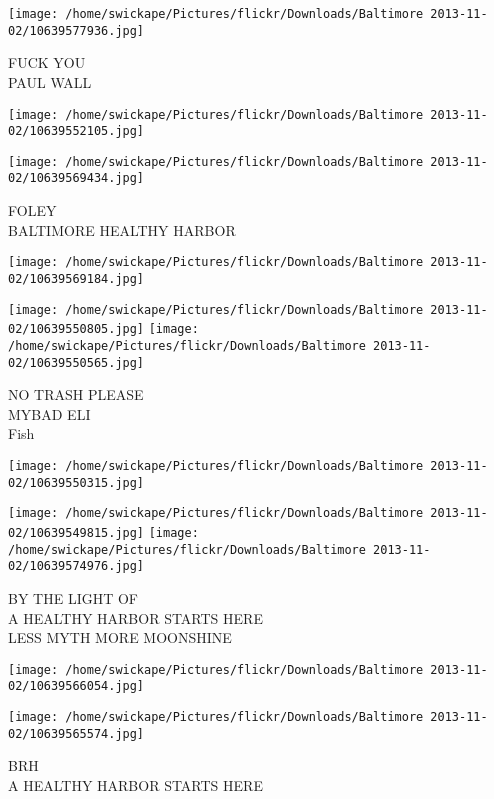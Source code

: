 \documentclass[10pt,letterpaper]{article}
\begin{document}
\vspace{0.25in}
\texttt{[image: /home/swickape/Pictures/flickr/Downloads/Baltimore 2013-11-02/10639577936.jpg]}

FUCK YOU\\
PAUL WALL
\pagebreak

\texttt{[image: /home/swickape/Pictures/flickr/Downloads/Baltimore 2013-11-02/10639552105.jpg]}

\vspace{0.25in}
\texttt{[image: /home/swickape/Pictures/flickr/Downloads/Baltimore 2013-11-02/10639569434.jpg]}

FOLEY\\
BALTIMORE HEALTHY HARBOR
\pagebreak

\texttt{[image: /home/swickape/Pictures/flickr/Downloads/Baltimore 2013-11-02/10639569184.jpg]}

\vspace{0.25in}
\texttt{[image: /home/swickape/Pictures/flickr/Downloads/Baltimore 2013-11-02/10639550805.jpg]}
\texttt{[image: /home/swickape/Pictures/flickr/Downloads/Baltimore 2013-11-02/10639550565.jpg]}

NO TRASH PLEASE\\
MYBAD ELI\\
Fish
\pagebreak

\texttt{[image: /home/swickape/Pictures/flickr/Downloads/Baltimore 2013-11-02/10639550315.jpg]}

\vspace{0.25in}
\texttt{[image: /home/swickape/Pictures/flickr/Downloads/Baltimore 2013-11-02/10639549815.jpg]}
\texttt{[image: /home/swickape/Pictures/flickr/Downloads/Baltimore 2013-11-02/10639574976.jpg]}

BY THE LIGHT OF\\
A HEALTHY HARBOR STARTS HERE\\
LESS MYTH MORE MOONSHINE
\pagebreak

\texttt{[image: /home/swickape/Pictures/flickr/Downloads/Baltimore 2013-11-02/10639566054.jpg]}

\vspace{0.25in}
\texttt{[image: /home/swickape/Pictures/flickr/Downloads/Baltimore 2013-11-02/10639565574.jpg]}

BRH\\
A HEALTHY HARBOR STARTS HERE
\pagebreak
\end{document}

